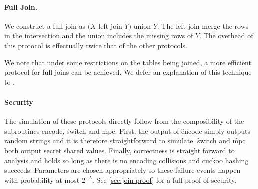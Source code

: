 \paragraph{Full Join.}
We construct a full join as $(X$ left join $Y)$ union $Y$. The left join merge the rows in the intersection and the union includes the missing rows of $Y$. The overhead of this protocol is effectually twice that of the other protocols. 

We note that under some restrictions on the tables being joined, a more efficient protocol for full joins can be achieved. We defer an explanation of this technique to .

\paragraph{Security} The simulation of these protocols directly follow from the composibility of the subroutines \f{encode}, \f{switch} and \f{mpc}. First, the output of \f{encode} simply outputs random strings and it is therefore straightforward to simulate.  \f{switch} and \f{mpc} both output secret shared values. Finally, correctness is straight forward to analysis and holds so long as there is no encoding collisions and cuckoo hashing succeeds. Parameters are chosen appropriately so these failure events happen with probability at most $2^{-\lambda}$. See \ref{sec:join-proof} for a full proof of security.


